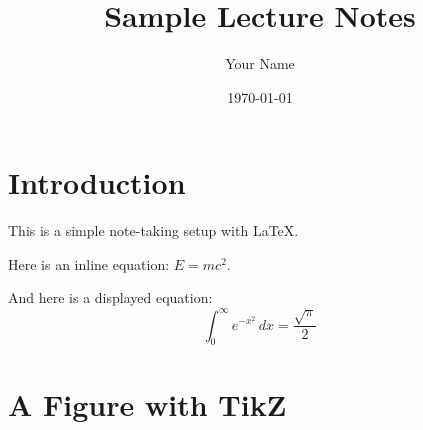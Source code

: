 \documentclass{article}
\title{Sample Lecture Notes}
\author{Your Name}
\date{\today}
\begin{document}
\maketitle

\section{Introduction}

This is a simple note-taking setup with \LaTeX.

Here is an inline equation: $E = mc^2$.

And here is a displayed equation:
\[
\int_0^\infty e^{-x^2} \, dx = \frac{\sqrt{\pi}}{2}
\]

\section{A Figure with TikZ}

\begin{center}
\end{center}
\end{document}
